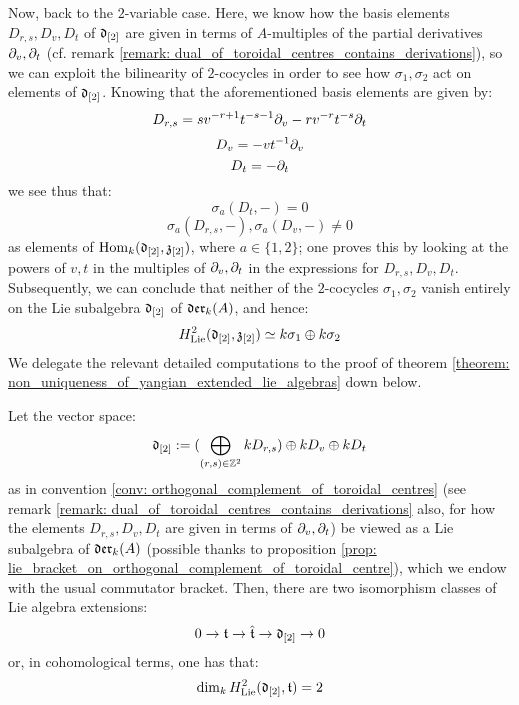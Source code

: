 \begin{remark}
            Now, back to the $2$-variable case. Here, we know how the basis elements $D_{r, s}, D_v, D_t$ of $\mathfrak{d}_{[2]}$ are given in terms of $A$-multiples of the partial derivatives $\partial_v, \partial_t$ (cf. remark \ref{remark: dual_of_toroidal_centres_contains_derivations}), so we can exploit the bilinearity of $2$-cocycles in order to see how $\sigma_1, \sigma_2$ act on elements of $\mathfrak{d}_{[2]}$. Knowing that the aforementioned basis elements are given by:
                $$D_{r, s} = s v^{-r + 1} t^{-s - 1} \partial_v - r v^{-r} t^{-s} \partial_t$$
                $$D_v = -v t^{-1} \partial_v$$
                $$D_t = -\partial_t$$
            we see thus that:
                $$\sigma_a(D_t, -) = 0$$
                $$\sigma_a(D_{r, s}, -), \sigma_a(D_v, -) \not = 0$$
            as elements of $\mathrm{Hom}_{k}(\mathfrak{d}_{[2]}, \mathfrak{z}_{[2]})$, where $a \in \{1, 2\}$; one proves this by looking at the powers of $v, t$ in the multiples of $\partial_v, \partial_t$ in the expressions for $D_{r, s}, D_v, D_t$. Subsequently, we can conclude that neither of the $2$-cocycles $\sigma_1, \sigma_2$ vanish entirely on the Lie subalgebra $\mathfrak{d}_{[2]}$ of $\mathfrak{der}_{k}(A)$, and hence:
                $$H^2_{\mathrm{Lie}}(\mathfrak{d}_{[2]}, \mathfrak{z}_{[2]}) \simeq k \sigma_1 \oplus k \sigma_2$$
            We delegate the relevant detailed computations to the proof of theorem \ref{theorem: non_uniqueness_of_yangian_extended_lie_algebras} down below.  
        \end{remark}
        \begin{theorem} \label{theorem: non_uniqueness_of_yangian_extended_lie_algebras}
            Let the vector space:
                $$\mathfrak{d}_{[2]} := (\bigoplus_{(r, s) \in \mathbb{Z}^2} k D_{r, s}) \oplus k D_v \oplus k D_t$$
            as in convention \ref{conv: orthogonal_complement_of_toroidal_centres} (see remark \ref{remark: dual_of_toroidal_centres_contains_derivations} also, for how the elements $D_{r, s}, D_v, D_t$ are given in terms of $\partial_v, \partial_t$) be viewed as a Lie subalgebra of $\mathfrak{der}_{k}(A)$ (possible thanks to proposition \ref{prop: lie_bracket_on_orthogonal_complement_of_toroidal_centre}), which we endow with the usual commutator bracket. Then, there are two isomorphism classes of Lie algebra extensions:
                $$0 \to \mathfrak{t} \to \hat{\mathfrak{t}} \to \mathfrak{d}_{[2]} \to 0$$
            or, in cohomological terms, one has that:
                $$\dim_{k} H^2_{\mathrm{Lie}}(\mathfrak{d}_{[2]}, \mathfrak{t}) = 2$$
        \end{theorem}
